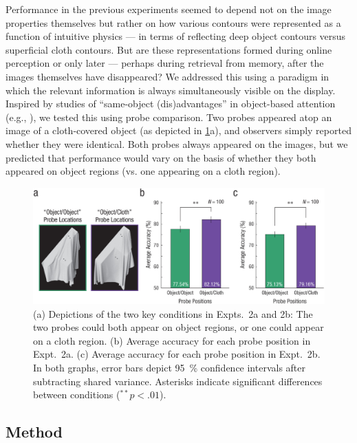 Performance in the previous experiments seemed to depend not on the image properties themselves but rather on how various contours were represented as a function of intuitive physics --- in terms of reflecting deep object contours versus superficial cloth contours. But are these representations formed during online perception or only later --- perhaps during retrieval from memory, after the images themselves have disappeared? We addressed this using a paradigm in which the relevant information is always simultaneously visible on the display. Inspired by studies of “same-object (dis)advantages” in object-based attention (e.g., \cite{egly_shifting_1994, marino_role_2005}), we tested this using probe comparison. Two probes appeared atop an image of a cloth-covered object (as depicted in \cref{fig:PsychSci2023_3}a), and observers simply reported whether they were identical. Both probes always appeared on the images, but we predicted that performance would vary on the basis of whether they both appeared on object regions (vs. one appearing on a cloth region).

\begin{figure}
    \centering
    \includegraphics[width=\textwidth]{figures/PsychSci2023/fig3_experiment2.jpeg}
    \caption
    { (a) Depictions of the two key conditions in Expts.~2a and 2b: The two probes could both appear on object regions, or one could appear on a cloth region. (b) Average accuracy for each probe position in Expt.~2a. (c) Average accuracy for each probe position in Expt.~2b. In both graphs, error bars depict \qty{95}{\percent} confidence intervals after subtracting shared variance. Asterisks indicate significant differences between conditions ($^{**}p < .01$).}
    \label{fig:PsychSci2023_3}
\end{figure}

\subsection{Method}

